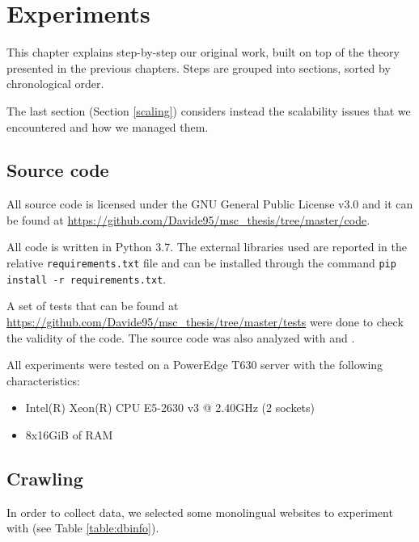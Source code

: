 \chapter{Experiments}
This chapter explains step-by-step our original work, built on top of the theory presented in the previous chapters.
Steps are grouped into sections, sorted by chronological order.

The last section (Section \ref{scaling}) considers instead the scalability issues that we encountered and how we managed them.

\section{Source code}
All source code is licensed under the GNU General Public License v3.0 and it can be found at \url{https://github.com/Davide95/msc_thesis/tree/master/code}.

All code is written in Python 3.7. The external libraries used are reported in the relative \texttt{requirements.txt} file and can be installed through the command \texttt{pip install -r requirements.txt}.

A set of tests that can be found at \url{https://github.com/Davide95/msc_thesis/tree/master/tests} were done to check the validity of the code.
The source code was also analyzed with  and .

All experiments were tested on a PowerEdge T630 server with the following characteristics:
\begin{itemize}
    \item Intel(R) Xeon(R) CPU E5-2630 v3 @ 2.40GHz (2 sockets)
    \item 8x16GiB of RAM
\end{itemize}

\section{Crawling}
In order to collect data, we selected some monolingual websites to experiment with (see Table \ref{table:dbinfo}).

